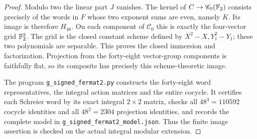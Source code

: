 \begin{proof}
Modulo two the linear part $J$ vanishes.  The kernel of
$C\to\mathscr C_0(\mathbb F_2)$ consists precisely of the words in $F$
whose two exponent sums are even, namely $K$.  Its image is therefore
$H_{48}$.  On each component of $\mathscr C_0$ this is exactly the
four-vector grid $\mathbb F_2^2$.  The grid is the closed constant scheme
defined by $X^2-X,Y_1^2-Y_1$; these two polynomials are separable.
This proves the closed immersion and factorization.  Projection from
the forty-eight vector-group components is faithfully flat, so its
composite has precisely this scheme-theoretic image.

The program \texttt{g\_signed\_fermat2.py} constructs the forty-eight
word representatives, the integral action matrices and the
entire cocycle.  It certifies each Schreier word by its exact integral
$2\times2$ matrix, checks all $48^3=110592$ cocycle identities and all
$48^2=2304$ projection identities, and records the complete model in
\texttt{g\_signed\_fermat2\_model.json}.  Thus the finite image assertion
is checked on the actual integral modular extension.
\end{proof}

